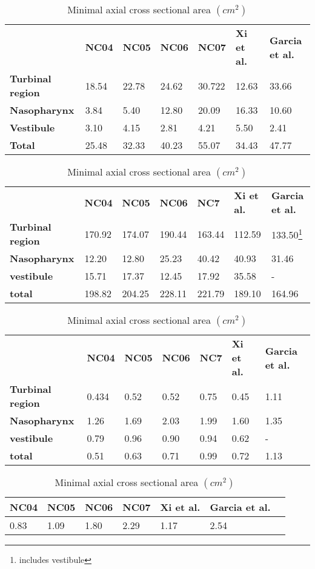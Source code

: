 \begin{table}[geometric comparison]
\begin{tabular}{lllllll}
 & \textbf{NC04} & \textbf{NC05} & \textbf{NC06} & \textbf{NC07} & \textbf{Xi et al.\cite{Xi2012}} & \textbf{Garcia et al.\cite{Garcia2007}} \\
\cline{2-7}
\textbf{Turbinal region} & 18.54 & 22.78 & 24.62& 30.722& 12.63& 33.66\\
\textbf{Nasopharynx}  & 3.84 & 5.40 & 12.80 & 20.09 & 16.33 & 10.60\\
\textbf{Vestibule} & 3.10 & 4.15 & 2.81 & 4.21 & 5.50 & 2.41\\
\textbf{Total} & 25.48 & 32.33 & 40.23 & 55.07 & 34.43 & 47.77 \\
\hline
\end{tabular}
\caption{ sectional volume, according to sections as seen in Figure \ref{fig:regions} ($ cm^3 $)}\label{tab:secvol}
\begin{tabular}{lllllll}
 & \textbf{NC04} & \textbf{NC05} & \textbf{NC06} & \textbf{NC7} & \textbf{Xi et al.\cite{Xi2012}} & \textbf{Garcia et al.\cite{Garcia2007}}\\
 \cline{2-7}
\textbf{Turbinal region} & 170.92 & 174.07& 190.44 & 163.44 & 112.59 & 133.50\footnote{includes vestibule} \\
\textbf{Nasopharynx} & 12.20 & 12.80 & 25.23 & 40.42 & 40.93 & 31.46\\
\textbf{vestibule} & 15.71 & 17.37 & 12.45 & 17.92 & 35.58 &  -\\
\textbf{total} & 198.82 & 204.25 & 228.11 & 221.79 & 189.10 & 164.96\\
\hline
\end{tabular}
\caption{sectional surface area, according to sections shown in Figure \ref{fig:regions}($ cm^2 $)}\label{tab:secsa}
\begin{tabular}{lllllll}
& \textbf{NC04}  & \textbf{NC05} & \textbf{NC06} & \textbf{NC7} & \textbf{Xi et al.\cite{Xi2012}} & \textbf{Garcia et al.\cite{Garcia2007}}\\
 \cline{2-7}
\textbf{Turbinal region} & 0.434 & 0.52 & 0.52 & 0.75 & 0.45 & 1.11\\
\textbf{Nasopharynx} & 1.26 & 1.69 & 2.03 & 1.99 & 1.60 & 1.35\\
\textbf{vestibule} & 0.79 & 0.96 & 0.90 & 0.94 & 0.62 &  - \\
\textbf{total} & 0.51 & 0.63 & 0.71 & 0.99 & 0.72 & 1.13 \\
\hline
\end{tabular}
\caption{Effective diameter $d_{eff} = \frac{4v}{a} (cm) $}\label{tab:deff}
\begin{tabular}{lllllll}
\textbf{NC04}& \textbf{NC05}& \textbf{NC06}&\textbf{ NC07}& \textbf{Xi et al.\cite{Xi2012}}& \textbf{Garcia et al.\cite{Garcia2007}}\\
\hline
0.83& 1.09& 1.80& 2.29& 1.17& 2.54
\end{tabular}
\caption{Minimal axial cross sectional area $(cm^2)$}\label{tab:mca}
\end{table}

